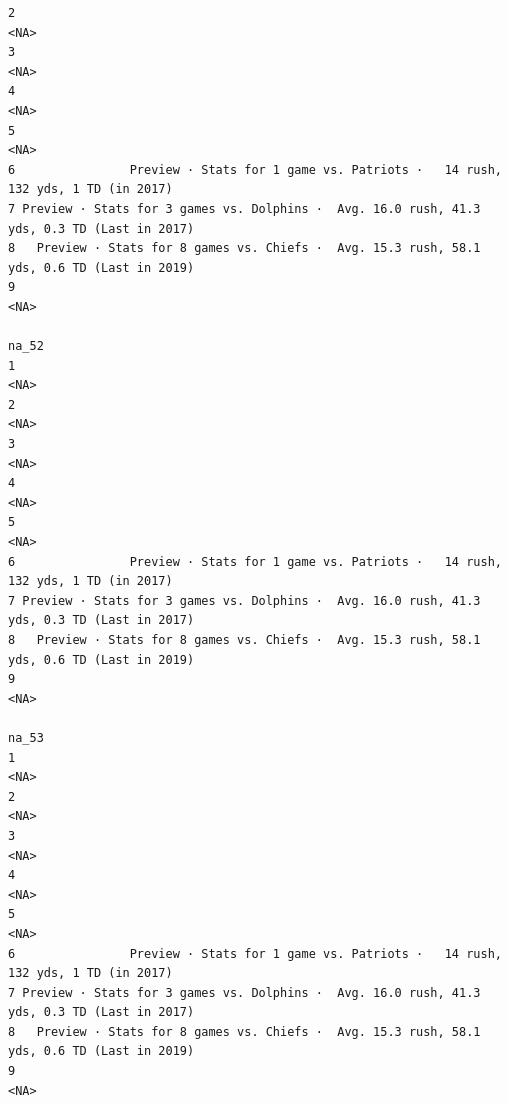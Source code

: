 \documentclass[
]{article}
\begin{document}
\begin{verbatim}
2                                                                                        <NA>
3                                                                                        <NA>
4                                                                                        <NA>
5                                                                                        <NA>
6                Preview · Stats for 1 game vs. Patriots ·   14 rush, 132 yds, 1 TD (in 2017)
7 Preview · Stats for 3 games vs. Dolphins ·  Avg. 16.0 rush, 41.3 yds, 0.3 TD (Last in 2017)
8   Preview · Stats for 8 games vs. Chiefs ·  Avg. 15.3 rush, 58.1 yds, 0.6 TD (Last in 2019)
9                                                                                        <NA>
                                                                                        na_52
1                                                                                        <NA>
2                                                                                        <NA>
3                                                                                        <NA>
4                                                                                        <NA>
5                                                                                        <NA>
6                Preview · Stats for 1 game vs. Patriots ·   14 rush, 132 yds, 1 TD (in 2017)
7 Preview · Stats for 3 games vs. Dolphins ·  Avg. 16.0 rush, 41.3 yds, 0.3 TD (Last in 2017)
8   Preview · Stats for 8 games vs. Chiefs ·  Avg. 15.3 rush, 58.1 yds, 0.6 TD (Last in 2019)
9                                                                                        <NA>
                                                                                        na_53
1                                                                                        <NA>
2                                                                                        <NA>
3                                                                                        <NA>
4                                                                                        <NA>
5                                                                                        <NA>
6                Preview · Stats for 1 game vs. Patriots ·   14 rush, 132 yds, 1 TD (in 2017)
7 Preview · Stats for 3 games vs. Dolphins ·  Avg. 16.0 rush, 41.3 yds, 0.3 TD (Last in 2017)
8   Preview · Stats for 8 games vs. Chiefs ·  Avg. 15.3 rush, 58.1 yds, 0.6 TD (Last in 2019)
9                                                                                        <NA>

\end{verbatim}
\end{document}
